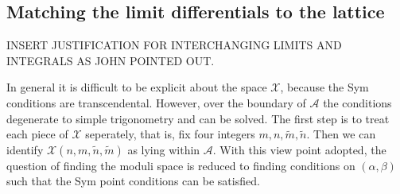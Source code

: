 \subsection{Matching the limit differentials to the lattice}
\label{sec:Matching the limit differentials to the lattice}

INSERT JUSTIFICATION FOR INTERCHANGING LIMITS AND INTEGRALS AS JOHN POINTED OUT.

In general it is difficult to be explicit about the space $\mathcal{X}$, because the Sym conditions are transcendental. However, over the boundary of $\mathcal{A}$ the conditions degenerate to simple trigonometry and can be solved. The first step is to treat each piece of $\mathcal{X}$ seperately, that is, fix four integers $m,n,\tilde m, \tilde n$. Then we can identify $\mathcal{X}(n,m,\tilde n,\tilde m)$ as lying within $\mathcal{A}$. With this view point adopted, the question of finding the moduli space is reduced to finding conditions on $(α,β)$ such that the Sym point conditions can be satisfied.


